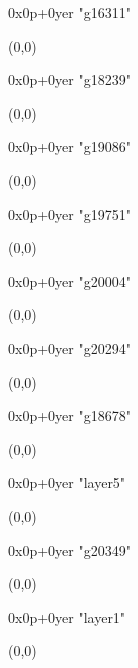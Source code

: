    0x0p+0yer "g16311"
  \begin{textblock}{1}(0,0)
  \end{textblock}

   0x0p+0yer "g18239"
  \begin{textblock}{1}(0,0)
  \end{textblock}

   0x0p+0yer "g19086"
  \begin{textblock}{1}(0,0)
  \end{textblock}

   0x0p+0yer "g19751"
  \begin{textblock}{1}(0,0)
  \end{textblock}

   0x0p+0yer "g20004"
  \begin{textblock}{1}(0,0)
  \end{textblock}

   0x0p+0yer "g20294"
  \begin{textblock}{1}(0,0)
  \end{textblock}

   0x0p+0yer "g18678"
  \begin{textblock}{1}(0,0)
  \end{textblock}

   0x0p+0yer "layer5"
  \begin{textblock}{1}(0,0)
  \end{textblock}

   0x0p+0yer "g20349"
  \begin{textblock}{1}(0,0)
  \end{textblock}

   0x0p+0yer "layer1"
  \begin{textblock}{1}(0,0)
  \end{textblock}

